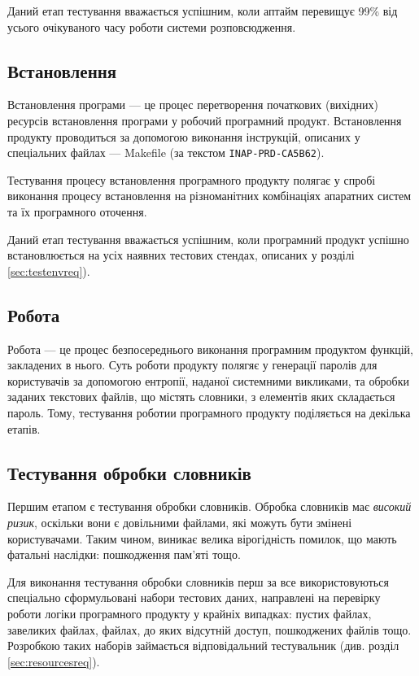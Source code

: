 \documentclass[a4paper,oneside,DIV=12,12pt]{scrartcl}
\begin{document}
			Даний етап тестування вважається успішним, коли аптайм перевищує 99\% від усього очікуваного часу роботи системи розповсюдження.
			
		\subsection{Встановлення}
			Встановлення програми --- це процес перетворення початкових (вихідних) ресурсів встановлення програми у робочий програмний продукт. Встановлення продукту проводиться за допомогою виконання інструкцій, описаних у спеціальних файлах --- Makefile (за текстом \texttt{INAP-PRD-CA5B62}).
			
			Тестування процесу встановлення програмного продукту полягає у спробі виконання процесу встановлення на різноманітних комбінаціях апаратних систем та їх програмного оточення.
			
			Даний етап тестування вважається успішним, коли програмний продукт успішно встановлюється на усіх наявних тестових стендах, описаних у розділі \ref{sec:testenvreq}).
			
		\subsection{Робота}
			Робота --- це процес безпосереднього виконання програмним продуктом функцій, закладених в нього. Суть роботи продукту полягяє у генерації паролів для користувачів за допомогою ентропії, наданої системними викликами, та обробки заданих текстових файлів, що містять словники, з елементів яких складається пароль. Тому, тестування роботии програмного продукту поділяється на декілька етапів.
			
			\subsection{Тестування обробки словників}
				Першим етапом є тестування обробки словників. Обробка словників має \emph{високий ризик}, оскільки вони є довільними файлами, які можуть бути змінені користувачами. Таким чином, виникає велика вірогідність помилок, що мають фатальні наслідки: пошкодження пам'яті тощо.
				
				Для виконання тестування обробки словників перш за все використовуються спеціально сформульовані набори тестових даних, направлені на перевірку роботи логіки програмного продукту у крайніх випадках: пустих файлах, завеликих файлах, файлах, до яких відсутній доступ, пошкоджених файлів тощо. Розробкою таких наборів займається відповідальний тестувальник (див. розділ \ref{sec:resourcesreq}).
\end{document}
